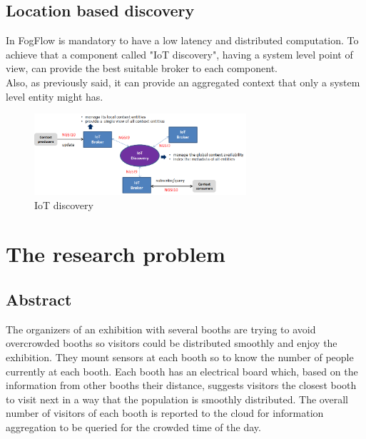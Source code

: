 \documentclass[a4paper]{article}
\begin{document}
\subsection{Location based discovery}
In FogFlow is mandatory to have a low latency and distributed computation. To achieve that a component called "IoT discovery", having a system level point of view, can provide the best suitable broker to each component.\\
Also, as previously said, it can provide an aggregated context that only a system level entity might has.

\begin{figure}[H]
    \centering
    \includegraphics[width=0.7\textwidth]{Images/distributed-brokers.png}
    \caption{IoT discovery}
\end{figure}{}

\newpage
\section{The research problem}
\subsection{Abstract}
The organizers of an exhibition with several booths are trying to avoid overcrowded booths so visitors could be distributed smoothly and enjoy the exhibition. They mount sensors at each booth so to know the number of people currently at each booth. Each booth has an electrical board which, based on the information from other booths their distance, suggests visitors the closest booth to visit next in a way that the population is smoothly distributed. The overall number of visitors of each booth is reported to the cloud for information aggregation to be queried for the crowded time of the day.
\end{document}
